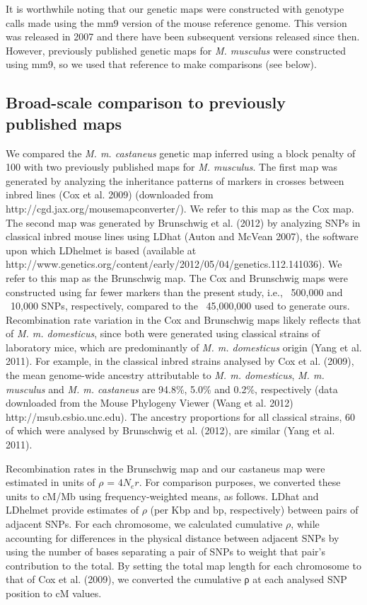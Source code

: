 It is worthwhile noting that our genetic maps were constructed with genotype calls made using the mm9 version of the mouse reference genome. This version was released in 2007 and there have been subsequent versions released since then. However, previously published genetic maps for \textit{M. musculus} were constructed using mm9, so we used that reference to make comparisons (see below).
 
\subsection{Broad-scale comparison to previously published maps}
 
We compared the \textit{M. m. castaneus} genetic map inferred using a block penalty of 100 with two previously published maps for \textit{M. musculus}. The first map was generated by analyzing the inheritance patterns of markers in crosses between inbred lines (Cox et al. 2009) (downloaded from http://cgd.jax.org/mousemapconverter/). We refer to this map as the Cox map. The second map was generated by Brunschwig et al. (2012) by analyzing SNPs in classical inbred mouse lines using LDhat (Auton and McVean 2007), the software upon which LDhelmet is based (available at http://www.genetics.org/content/early/2012/05/04/genetics.112.141036). We refer to this map as the Brunschwig map. The Cox and Brunschwig maps were constructed using far fewer markers than the present study, i.e., ~500,000 and ~10,000 SNPs, respectively, compared to the ~45,000,000 used to generate ours. Recombination rate variation in the Cox and Brunschwig maps likely reflects that of \textit{M. m. domesticus}, since both were generated using classical strains of laboratory mice, which are predominantly of \textit{M. m. domesticus} origin (Yang et al. 2011). For example, in the classical inbred strains analysed by Cox et al. (2009), the mean genome-wide ancestry attributable to \textit{M. m. domesticus}, \textit{M. m. musculus} and \textit{M. m. castaneus} are 94.8\%, 5.0\% and 0.2\%, respectively (data downloaded from the Mouse Phylogeny Viewer (Wang et al. 2012) http://msub.csbio.unc.edu). The ancestry proportions for all classical strains, 60 of which were analysed by Brunschwig et al. (2012), are similar (Yang et al. 2011).

Recombination rates in the Brunschwig map and our castaneus map were estimated in units of $\rho$ = $4N_er$. For comparison purposes, we converted these units to cM/Mb using frequency-weighted means, as follows. LDhat and LDhelmet provide estimates of $\rho$ (per Kbp and bp, respectively) between pairs of adjacent SNPs. For each chromosome, we calculated cumulative $\rho$, while accounting for differences in the physical distance between adjacent SNPs by using the number of bases separating a pair of SNPs to weight that pair’s contribution to the total. By setting the total map length for each chromosome to that of Cox et al. (2009), we converted the cumulative ρ at each analysed SNP position to cM values.
 
